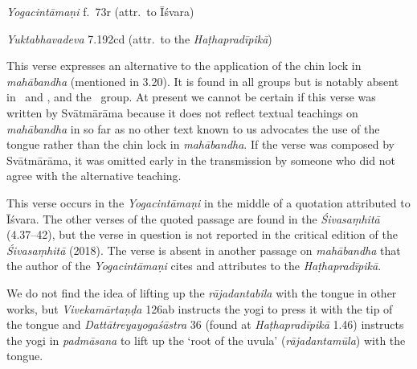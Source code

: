 \begin{ekdosis}
\begin{testimonia}[hp03_022]
\emph{Yogacintāmaṇi} f.~73r (attr.~to Īśvara)%
\begin{versinnote}
\end{versinnote}

\emph{Yuktabhavadeva} 7.192cd (attr.~to the \emph{Haṭhapradīpikā})
\begin{versinnote}
\end{versinnote}
\end{testimonia}

\begin{philcomm}[hp03_022]
This verse expresses an alternative to the application of the chin lock in \emph{mahā\-bandha} (mentioned in 3.20). It is found in all groups but is notably absent in \alphaOne\ and \alphaTwo, and the \textbeta\ group. At present we cannot be certain if this verse was written by Svātmārāma because it does not reflect textual teachings on \emph{mahābandha} in so far as no other text known to us advocates the use of the tongue rather than the chin lock in \emph{mahābandha}. If the verse was composed by Svātmārāma, it was omitted early in the transmission by someone who did not agree with the alternative teaching.

This verse occurs in the \emph{Yogacintāmaṇi} in the middle of a quotation attributed to Īśvara. The other verses of the quoted passage are found in the \emph{Śivasaṃhitā} (4.37–42), but the verse in question is not reported in the critical edition of the \emph{Śivasaṃhitā} (2018). The verse is absent in another passage on \emph{mahābandha} that the author of the \emph{Yogacintāmaṇi} cites and attributes to the \emph{Haṭhapradīpikā}.

We do not find the idea of lifting up the \emph{rājadantabila} with the tongue in other works, but \emph{Vivekamārtaṇḍa} 126ab instructs the yogi to press it with the tip of the tongue and \emph{Dattātreyayogaśāstra} 36 (found at \emph{Haṭhapradīpikā} 1.46) instructs the yogi in \emph{padmāsana} to lift up the `root of the uvula' (\emph{rājadantamūla}) with the tongue.
\end{philcomm}


\end{ekdosis}
